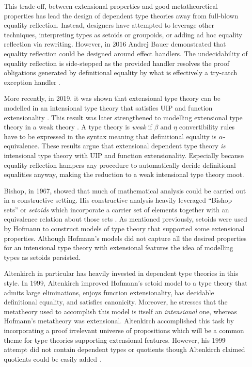 This trade-off, between extensional properties and good metatheoretical properties has lead the design of dependent type theories away from full-blown equality reflection.
Instead, designers have attempted to leverage other techniques, interpreting types as setoids or groupoids, or adding ad hoc equality reflection via rewriting.
However, in 2016 Andrej Bauer demonstrated that equality reflection could be designed around effect handlers.
The undecidability of equality reflection is side-stepped as the provided handler resolves the proof obligations generated by definitional equality by what is effectively a try-catch exception handler \cite{bauer2016}.

More recently, in 2019, it was shown that extensional type theory can be modelled in an intensional type theory that satisfies UIP and function extensionality \cite{winterhalter2019}.
This result was later strengthened to modelling extensional type theory in a weak theory \cite{boulier2019}.
A type theory is \textit{weak} if $\beta$ and $\eta$ convertibility rules have to be expressed in the syntax meaning that definitional equality is $\alpha$-equivalence.
These results argue that extensional dependent type theory \textit{is} intensional type theory with UIP and function extensionality.
Especially because equality reflection hampers any procedure to automatically decide definitional equalities anyway, making the reduction to a weak intensional type theory moot.

Bishop, in 1967, showed that much of mathematical analysis could be carried out in a constructive setting.
His constructive analysis heavily leveraged ``Bishop sets'' or \textit{setoids} which incorporate a carrier set of elements together with an equivalence relation about those sets \cite{bishop1967}.
As mentioned previously, setoids were used by Hofmann to construct models of type theory that supported some extensional properties.
Although Hofmann's models did not capture all the desired properties for an intensional type theory with extensional features the idea of modelling types as setoids persisted.

Altenkirch in particular has heavily invested in dependent type theories in this style.
In 1999, Altenkirch improved Hofmann's setoid model to a type theory that admits large eliminations, enjoys function extensionality, has decidable definitional equality, and satisfies canonicity.
Moreover, he stresses that the metatheory used to accomplish this model is itself an \textit{intensional} one, whereas Hofmann's metatheory was extensional.
Altenkirch accomplished this task by incorporating a proof irrelevant universe of propositions which will be a common theme for type theories supporting extensional features.
However, his 1999 attempt did not contain dependent types or quotients though Altenkirch claimed quotients could be easily added \cite{altenkirch1999}.

